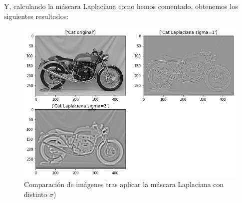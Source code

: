 \documentclass[12pt,spanish]{article}
\begin{document}
Y, calculando la máscara Laplaciana como hemos comentado, obtenemos los siguientes resultados: 

\begin{figure}[H]
	\centering
	\includegraphics[width=\textwidth]{./imagenes_memoria/motocicleta_laplaciana.png}
	\caption{Comparación de imágenes tras aplicar la máscara Laplaciana con distinto $\sigma$)}
	\label{comp_sigma_laplaciana}
\end{figure}
\end{document}
